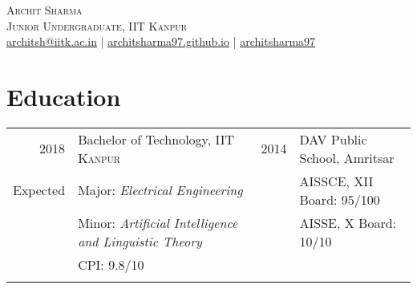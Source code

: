 \documentclass[a4paper,10pt]{article}
\begin{document}

\pagestyle{empty} %


\par{\centering
		{\hspace{-2mm}\Huge \textsc{Archit Sharma}
	}\\\large \textsc{Junior Undergraduate, IIT Kanpur}\\\normalsize \Letter\hspace{1mm}\href{mailto:architsh@iitk.ac.in}{architsh@iitk.ac.in} | \Mundus\hspace{1mm}\href{https://architsharma97.github.io/}{ architsharma97.github.io} | \faGithub \hspace{0mm} \href{https://github.com/architsharma97/}{architsharma97} \par}
	
\section{Education}
\begin{tabular}{rl|rl}	
\textsc{2018} & \large Bachelor of Technology, \textsc{IIT Kanpur} & \textsc{2014} & \large DAV Public School, Amritsar \\
Expected & {Major}: \textit{Electrical Engineering} & & AISSCE, XII Board: 95/100\\
         & {Minor}: \textit{Artificial Intelligence and Linguistic Theory}& & AISSE, X Board: 10/10\\ 
         & {CPI}: \textsc{9.8/10} \\
         & \\
\end{tabular}
\end{document}
